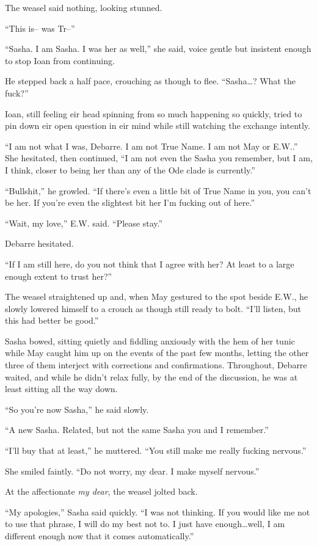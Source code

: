 The weasel said nothing, looking stunned.

``This is-- was Tr--''

``Sasha. I am Sasha. I was her as well,'' she said, voice gentle but insistent enough to stop Ioan from continuing.

He stepped back a half pace, crouching as though to flee. ``Sasha\ldots? What the fuck?''

Ioan, still feeling eir head spinning from so much happening so quickly, tried to pin down eir open question in eir mind while still watching the exchange intently.

``I am not what I was, Debarre. I am not True Name. I am not May or E.W..'' She hesitated, then continued, ``I am not even the Sasha you remember, but I am, I think, closer to being her than any of the Ode clade is currently.''

``Bullshit,'' he growled. ``If there's even a little bit of True Name in you, you can't be her. If you're even the slightest bit her I'm fucking out of here.''

``Wait, my love,'' E.W. said. ``Please stay.''

Debarre hesitated.

``If I am still here, do you not think that I agree with her? At least to a large enough extent to trust her?''

The weasel straightened up and, when May gestured to the spot beside E.W., he slowly lowered himself to a crouch as though still ready to bolt. ``I'll listen, but this had better be good.''

Sasha bowed, sitting quietly and fiddling anxiously with the hem of her tunic while May caught him up on the events of the past few months, letting the other three of them interject with corrections and confirmations. Throughout, Debarre waited, and while he didn't relax fully, by the end of the discussion, he was at least sitting all the way down.

``So you're now Sasha,'' he said slowly.

``A new Sasha. Related, but not the same Sasha you and I remember.''

``I'll buy that at least,'' he muttered. ``You still make me really fucking nervous.''

She smiled faintly. ``Do not worry, my dear. I make myself nervous.''

At the affectionate \emph{my dear}, the weasel jolted back.

``My apologies,'' Sasha said quickly. ``I was not thinking. If you would like me not to use that phrase, I will do my best not to. I just have enough\ldots well, I am different enough now that it comes automatically.''

